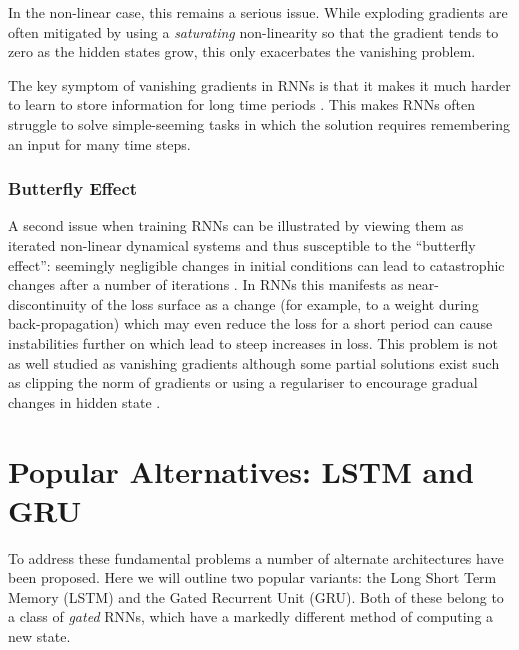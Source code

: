 In the non-linear case, this remains a serious issue. While exploding gradients are often
mitigated by using a \emph{saturating} non-linearity so that the gradient tends to zero as the
hidden states grow, this only exacerbates the vanishing problem. 

The key symptom of vanishing gradients in RNNs is that it makes it much harder to learn to
store information for long time periods \autocite{Bengio1994}. This makes RNNs often struggle to
solve simple-seeming tasks in which the solution requires remembering an input for many
time steps. 

\subsubsection{Butterfly Effect}
A second issue when training RNNs can be illustrated by viewing them as iterated non-linear	
dynamical systems and thus susceptible to the ``butterfly effect'': seemingly negligible changes
in initial conditions can lead to catastrophic changes after a number of iterations
\autocite{Lorenz1963}. In RNNs this manifests as near-discontinuity of the loss surface
\autocite{Pascanu2012} as a change (for example, to a weight during back-propagation) which may
even reduce the loss for a short period can cause instabilities further on which lead to steep
increases in loss. This problem is not as well studied as vanishing gradients although some
partial solutions exist such as clipping the norm of gradients \autocite{Pascanu2012} or
using a regulariser to encourage gradual changes in hidden state \autocite{Krueger2016}.

\section{Popular Alternatives: LSTM and GRU}
To address these fundamental problems a number of alternate architectures have been proposed.
Here we will outline two popular variants: the Long Short Term Memory (LSTM) and the Gated
Recurrent Unit (GRU). Both of these belong to a class of \emph{gated} RNNs, which have a
markedly different method of computing a new state.

